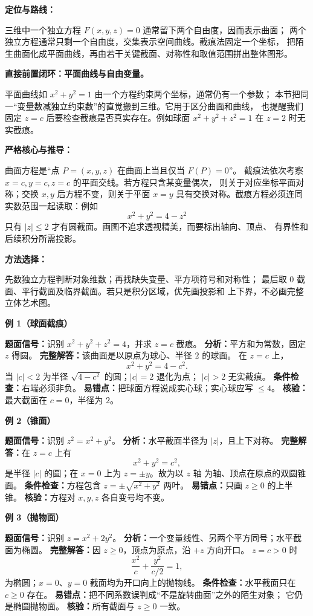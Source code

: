 \begin{knowledgeBox}
\textbf{定位与路线：}

三维中一个独立方程 \(F(x,y,z)=0\) 通常留下两个自由度，因而表示曲面；
两个独立方程通常只剩一个自由度，交集表示空间曲线。截痕法固定一个坐标，
把陌生曲面化成平面曲线，再由若干关键截面、对称性和取值范围拼出整体图形。

\textbf{直接前置闭环：平面曲线与自由变量。}

平面曲线如 \(x^2+y^2=1\) 由一个方程约束两个坐标，通常仍有一个参数；
本节把同一“变量数减独立约束数”的直觉搬到三维。它用于区分曲面和曲线，
也提醒我们固定 \(z=c\) 后要检查截痕是否真实存在。例如球面
\(x^2+y^2+z^2=1\) 在 \(z=2\) 时无实截痕。

\textbf{严格核心与推导：}

曲面方程是“点 \(P=(x,y,z)\) 在曲面上当且仅当 \(F(P)=0\)”。
截痕法依次考察 \(x=c,y=c,z=c\) 的平面交线。若方程只含某变量偶次，
则关于对应坐标平面对称；交换 \(x,y\) 后方程不变，则关于平面 \(x=y\)
具有交换对称。截痕方程必须连同实数范围一起读取：例如
\[
x^2+y^2=4-z^2
\]
只有 \(|z|\le2\) 才有圆截面。画图不追求透视精美，而要标出轴向、顶点、
有界性和后续积分所需投影。

\textbf{方法选择：}

先数独立方程判断对象维数；再找缺失变量、平方项符号和对称性；
最后取 \(0\) 截面、平行截面及临界截面。若只是积分区域，优先画投影和
上下界，不必画完整立体艺术图。

\textbf{例 1（球面截痕）}

\textbf{题面信号：}识别 \(x^2+y^2+z^2=4\)，并求 \(z=c\) 截痕。
\textbf{分析：}平方和为常数，固定 \(z\) 得圆。
\textbf{完整解答：}该曲面是以原点为球心、半径 \(2\) 的球面。
在 \(z=c\) 上，
\[
x^2+y^2=4-c^2.
\]
当 \(|c|<2\) 为半径 \(\sqrt{4-c^2}\) 的圆；\(|c|=2\) 退化为点；
\(|c|>2\) 无实截痕。
\textbf{条件检查：}右端必须非负。
\textbf{易错点：}把球面方程说成实心球；实心球应写 \(\le4\)。
\textbf{核验：}最大截面在 \(c=0\)，半径为 \(2\)。

\textbf{例 2（锥面）}

\textbf{题面信号：}识别 \(z^2=x^2+y^2\)。
\textbf{分析：}水平截面半径为 \(|z|\)，且上下对称。
\textbf{完整解答：}在 \(z=c\) 上有
\[
x^2+y^2=c^2,
\]
是半径 \(|c|\) 的圆；在 \(x=0\) 上为 \(z=\pm y\)。故为以 \(z\) 轴
为轴、顶点在原点的双圆锥面。
\textbf{条件检查：}方程包含 \(z=\pm\sqrt{x^2+y^2}\) 两叶。
\textbf{易错点：}只画 \(z\ge0\) 的上半锥。
\textbf{核验：}方程对 \(x,y,z\) 各自变号均不变。

\textbf{例 3（抛物面）}

\textbf{题面信号：}识别 \(z=x^2+2y^2\)。
\textbf{分析：}一个变量线性、另两个平方同号；水平截面为椭圆。
\textbf{完整解答：}因 \(z\ge0\)，顶点为原点，沿 \(+z\) 方向开口。
\(z=c>0\) 时
\[
\frac{x^2}{c}+\frac{y^2}{c/2}=1,
\]
为椭圆；\(x=0\)、\(y=0\) 截面均为开口向上的抛物线。
\textbf{条件检查：}水平截面只在 \(c\ge0\) 存在。
\textbf{易错点：}把不同系数误判成“不是旋转曲面”之外的陌生对象；
它仍是椭圆抛物面。
\textbf{核验：}所有截面与 \(z\ge0\) 一致。


\end{knowledgeBox}
